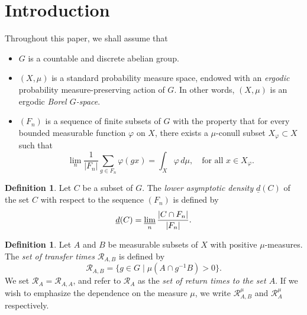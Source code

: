 \documentclass[11pt]{article}
\numberwithin{equation}{section}
\let\mathcal\mathscr
\newcommand{\cR}{\mathcal{R}}
\theoremstyle{plain}
\theoremstyle{definition}
\newtheorem{definition}[theorem]{Definition}
\begin{document}
\vspace*{-1.5\baselineskip}
\vskip0pt\enlargethispage{.5\baselineskip}%
\section{Introduction}

Throughout this paper, we shall assume that
\begin{itemize}
\item $G$ is a countable and discrete abelian group.

\item $(X,\mu)$ is a standard probability measure space, endowed with an \emph{ergodic} probability measure-preserving action of $G$.
In other words, $(X,\mu)$ is an ergodic \emph{Borel $G$-space}.

\item $(F_n)$ is a sequence of finite subsets of $G$ with the property that for every bounded measurable function $\varphi$ on $X$, there
exists a $\mu$-conull subset $X_\varphi \subset X$ such that
\begin{equation}
\label{pointwise}
\lim_n \frac{1}{|F_n|} \sum_{g \in F_n} \varphi(gx) = \int_X \varphi \, d\mu, \quad \textrm{for all $x \in X_\varphi$}.
\end{equation}
\end{itemize}

\begin{definition}
Let $C$ be a subset of $G$. The \emph{lower asymptotic density} $\underline{d}(C)$ of the set $C$ with respect to the sequence $(F_n)$ is defined by
\begin{equation}
\label{def_lad}
\underline{d}(C) = \varliminf_n \frac{|C \cap F_n|}{|F_n|}.
\end{equation}
\end{definition}

\begin{definition}
Let $A$ and $B$ be measurable subsets of $X$ with positive $\mu$-measures. The \emph{set of transfer times $\cR_{A,B}$} is defined by
\begin{equation}
\label{def_RAB}
\cR_{A,B} = \bigl\{ g \in G \mid  \mu(A \cap g^{-1}B) > 0 \bigr\}.
\end{equation}
We set $\cR_A = \cR_{A,A}$, and refer to $\cR_A$ as the \emph{set of return times to the set $A$}. If we wish to emphasize the dependence on
the measure $\mu$, we write $\cR^\mu_{A,B}$ and $\cR^{\mu}_A$ respectively.
\end{definition}
\end{document}
